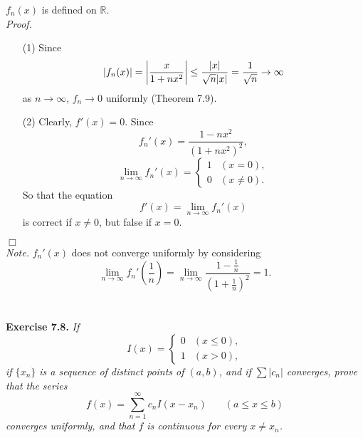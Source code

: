 \documentclass{article}
\begin{document}
$f_n(x)$ is defined on $\mathbb{R}$. \\

\emph{Proof.}
\begin{enumerate}
  \item[(1)]
  Since
  \[
    \abs{ f_n(x) }
    = \abs{ \frac{x}{1+nx^2} }
    \leq \frac{|x|}{\sqrt{n}|x|}
    = \frac{1}{\sqrt{n}} \to \infty
  \]
  as $n \to \infty$, $f_n \to 0$ uniformly (Theorem 7.9).

  \item[(2)]
  Clearly, $f'(x) = 0$.
  Since
  \[
    f_n'(x) = \frac{1-nx^2}{(1+nx^2)^2},
  \]
  \begin{equation*}
  \lim_{n \to \infty} f_n'(x) =
    \begin{cases}
      1 & (x = 0), \\
      0 & (x \neq 0).
    \end{cases}
  \end{equation*}
  So that the equation
  \[
    f'(x) = \lim_{n \to \infty} f_n'(x)
  \]
  is correct if $x \neq 0$, but false if $x = 0$.
\end{enumerate}
$\Box$ \\

\emph{Note.}
$f_n'(x)$ does not converge uniformly by considering
\[
  \lim_{n \to \infty} f_n'\left(\frac{1}{n}\right)
  = \lim_{n \to \infty} \frac{1-\frac{1}{n}}{(1+\frac{1}{n})^2}
  = 1.
\]
\\\\






\textbf{Exercise 7.8.}
\emph{If
  \begin{equation*}
  I(x) =
    \begin{cases}
      0 & (x \leq 0), \\
      1 & (x > 0),
    \end{cases}
  \end{equation*}
if $\{ x_n \}$ is a sequence of distinct points of $(a,b)$,
and if $\sum|c_n|$ converges,
prove that the series
\[
  f(x) = \sum_{n=1}^{\infty} c_n I(x-x_n)
  \:\:\:\:\:\:\:\:
  (a \leq x \leq b)
\]
converges uniformly,
and that $f$ is continuous for every $x \neq x_n$.} \\
\end{document}
